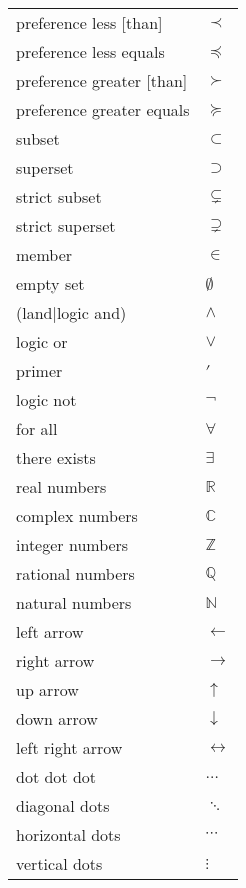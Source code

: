 \documentclass[12pt, a4paper]{article}
\begin{document}
\begin{longtable}{ll}
preference less [than] & $\prec$ \\
preference less equals & $\preceq$ \\
preference greater [than] & $\succ$ \\
preference greater equals & $\succeq$ \\
subset & $\subset$ \\
superset & $\supset$ \\
strict subset & $\subsetneq$ \\
strict superset & $\supsetneq$ \\
member & $\in$ \\
empty set & $\emptyset$ \\
(land|logic and) & $\land$ \\
logic or & $\lor$ \\
primer & $\prime$ \\
logic not & $\lnot$ \\
for all & $\forall$ \\
there exists & $\exists$ \\
real numbers & $\mathbb{R}$ \\
complex numbers & $\mathbb{C}$ \\
integer numbers & $\mathbb{Z}$ \\
rational numbers & $\mathbb{Q}$ \\
natural numbers & $\mathbb{N}$ \\
left arrow & $\leftarrow$ \\
right arrow & $\rightarrow$ \\
up arrow & $\uparrow$ \\
down arrow & $\downarrow$ \\
left right arrow & $\leftrightarrow$ \\
dot dot dot & $\dots$ \\
diagonal dots & $\ddots$ \\
horizontal dots & $\cdots$ \\
vertical dots & $\vdots$ \\
\end{longtable}
\end{document}
